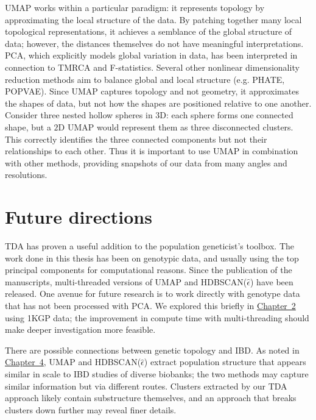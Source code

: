 UMAP works within a particular paradigm: it represents topology by approximating the local structure of the data. By patching together many local topological representations, it achieves a semblance of the global structure of data; however, the distances themselves do not have meaningful interpretations. PCA, which explicitly models global variation in data, has been interpreted in connection to TMRCA and F-statistics\citep{mcvean2009genealogical,peter_geometric_2022}. Several other nonlinear dimensionality reduction methods aim to balance global and local structure (e.g. PHATE\citep{moon2019visualizing}, POPVAE\citep{battey_visualizing_2021}). Since UMAP captures topology and not geometry, it approximates the shapes of data, but not how the shapes are positioned relative to one another. Consider three nested hollow spheres in $3$D: each sphere forms one connected shape, but a $2$D UMAP would represent them as three disconnected clusters\citep{herrmann_enhancing_2022}. This correctly identifies the three connected components but not their relationships to each other. Thus it is important to use UMAP in combination with other methods, providing snapshots of our data from many angles and resolutions.

\section{Future directions}

TDA has proven a useful addition to the population geneticist's toolbox. The work done in this thesis has been on genotypic data, and usually using the top principal components for computational reasons. Since the publication of the manuscripts, multi-threaded versions of UMAP and HDBSCAN($\hat{\epsilon}$) have been released. One avenue for future research is to work directly with genotype data that has not been processed with PCA. We explored this briefly in \hyperref[chap:chapter2]{Chapter~2} using 1KGP data; the improvement in compute time with multi-threading should make deeper investigation more feasible.

There are possible connections between genetic topology and IBD. As noted in \hyperref[chap:chapter4]{Chapter~4}, UMAP and HDBSCAN($\hat{\epsilon}$) extract population structure that appears similar in scale to IBD studies of diverse biobanks; the two methods may capture similar information but via different routes. Clusters extracted by our TDA approach likely contain substructure themselves, and an approach that breaks clusters down further may reveal finer details.

